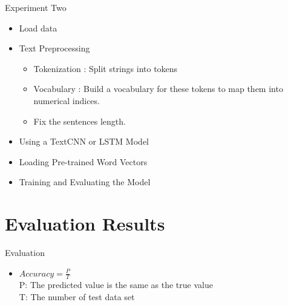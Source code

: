 \documentclass[
 size=14pt,
 paper=smartboard,  %
 mode=present, 		%
 display=slides, 	%
 style=tuliplab,  	%
 pauseslide,
 fleqn,leqno]{powerdot}
\begin{document}
\begin{slide}{Experiment Two }
	\bigskip
	
	\begin{itemize}
		
		\item 
		Load data
		\item 
		Text Preprocessing
		
		\begin{itemize}
			\item 
			Tokenization : Split strings into tokens
			\item 
			Vocabulary : Build a vocabulary for these tokens to map them into numerical indices.
			\item 
			Fix the sentences length.
		\end{itemize}
		
		\item 
		Using a TextCNN or LSTM Model
		
		\item 
		Loading Pre-trained Word Vectors
		
		\item 
		Training and Evaluating the Model
		
	\end{itemize}
	
\end{slide}


\section{Evaluation Results}


\begin{slide}[toc=,bm=]{Evaluation}

\begin{center}
\begin{itemize}

\item
\smallskip
\large
{$Accuracy = \frac{P}{T}$ \\
P: The predicted value is the same as the true value \\

T: The number of test data set}

\end{itemize}
\end{center}

\end{slide}
\end{document}
